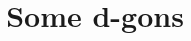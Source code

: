 \documentclass[12pt]{article}
\title{Some d-gons}
\begin{document}
\begin{center}
\epsfxsize=160mm
\end{center}
\end{document}
